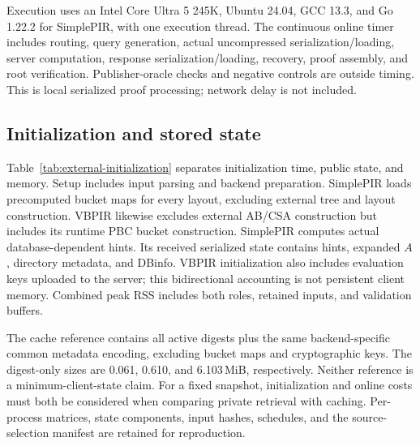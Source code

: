Execution uses an Intel Core Ultra 5 245K, Ubuntu 24.04, GCC 13.3, and Go 1.22.2 for SimplePIR, with one execution thread. The continuous online timer includes routing, query generation, actual uncompressed serialization/loading, server computation, response serialization/loading, recovery, proof assembly, and root verification. Publisher-oracle checks and negative controls are outside timing. This is local serialized proof processing; network delay is not included.

\subsection{Initialization and stored state}

\begin{table}[t]
\centering
\fontsize{8.5}{10}\selectfont
\setlength{\tabcolsep}{3pt}
\caption{Uniform-cohort initialization and state. Paired cells list AB (ours)/PBC~\cite{sealpir}; native placement follows VBPIR~\cite{vectorbatchpir}. Each method has three complete processes. $I$ is mean setup time in seconds. $H$ is the database-dependent hint, $A/K$ is expanded SimplePIR $A$ or VBPIR evaluation-key payload, $D$ is the serialized public directory, and $S$ is total serialized initialization components, including relevant framing and DBinfo. $H,A/K,D,S,F$ are MiB; combined peak RSS is GiB. $F$ is the common-metadata cache reference. VBPIR has no SimplePIR-style downloaded hint. Byte quantities are deterministic; RSS and setup values are means.}
\label{tab:external-initialization}

\end{table}

Table~\ref{tab:external-initialization} separates initialization time, public state, and memory. Setup includes input parsing and backend preparation. SimplePIR loads precomputed bucket maps for every layout, excluding external tree and layout construction. VBPIR likewise excludes external AB/CSA construction but includes its runtime PBC bucket construction. SimplePIR computes actual database-dependent hints. Its received serialized state contains hints, expanded $A$, directory metadata, and DBinfo. VBPIR initialization also includes evaluation keys uploaded to the server; this bidirectional accounting is not persistent client memory. Combined peak RSS includes both roles, retained inputs, and validation buffers.

The cache reference contains all active digests plus the same backend-specific common metadata encoding, excluding bucket maps and cryptographic keys. The digest-only sizes are 0.061, 0.610, and 6.103\,MiB, respectively. Neither reference is a minimum-client-state claim. For a fixed snapshot, initialization and online costs must both be considered when comparing private retrieval with caching. Per-process matrices, state components, input hashes, schedules, and the source-selection manifest are retained for reproduction.
